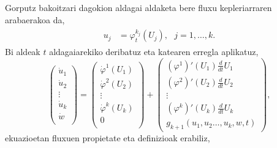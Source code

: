 Gorputz bakoitzari dagokion aldagai aldaketa bere fluxu kepleriarraren arabaerakoa da,
\begin{align}
\label{eq:aldfl2}
\begin{split}
u_j&= \varphi_t^{k_j}(U_j), \ \ \ j=1,\dots,k.
\end{split}
\end{align}
Bi aldeak $t$ aldagaiarekiko deribatuz eta katearen erregla aplikatuz,
\begin{equation*}
\left(\begin{array}{c}
                \dot{u}_1  \\
                \dot{u}_2  \\
                \vdots \\
                \dot{u}_k    \\
                \dot{w}      \\
\end{array}\right)=
\left(\begin{array}{c}
                \dot{\varphi}^1(U_1)  \\
                \dot{\varphi}^2(U_2)   \\
                \vdots \\
                \dot{\varphi}^k(U_k)   \\
                0      \\
\end{array}\right)+
\left(\begin{array}{c}
      (\varphi^1)'(U_1) \frac{d}{dt}U_1 \\
      (\varphi^2)'(U_2) \frac{d}{dt}U_2 \\
                \vdots \\
      (\varphi^k)'(U_k) \frac{d}{dt}U_k\\
      g_{k+1}(u_1, u_2\dots, u_k,w,t)
\end{array}\right),
\end{equation*}
ekuazioetan fluxuen propietate eta definizioak erabiliz,
